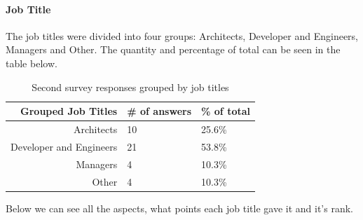 \documentclass{article}
\begin{document}
\paragraph{Job Title}

The job titles were divided into four groups: Architects, Developer and
Engineers, Managers and Other. The quantity and percentage of total can
be seen in the table below.

\begin{table}[H]
\centering
\begin{tabularx}{\columnwidth}{r l l}
\textbf{Grouped Job Titles} &    \textbf{\# of answers} &     \textbf{\% of total} \\\hline
Architects              & 10           & 25.6\%  \\ \hline
Developer and Engineers & 21           & 53.8\%  \\\hline
Managers                & 4            & 10.3\%  \\\hline
Other                   & 4            & 10.3\%  \\\hline
\end{tabularx}
\caption{Second survey responses grouped by job titles}
\label{tab:my_label}
\end{table}

Below we can see all the aspects, what points each job title gave it and
it's rank.
\end{document}
